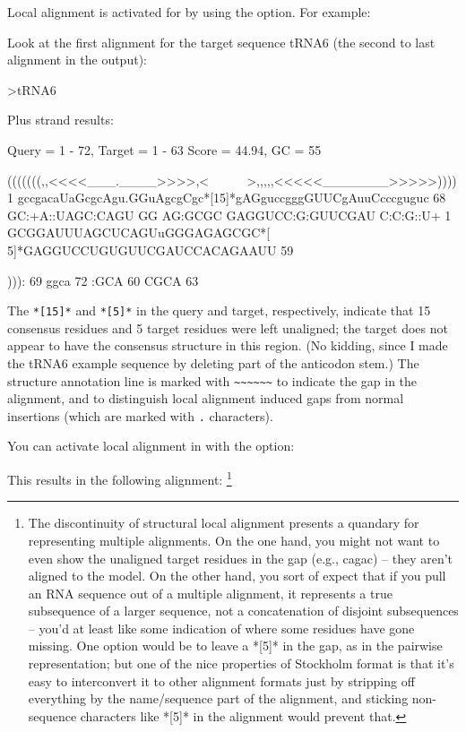 Local alignment is activated for  by using the
 option. For example:


Look at the first alignment for the target sequence tRNA6 (the second
to last alignment in the output): 

\begin{sreoutput}
>tRNA6

  Plus strand results:

 Query = 1 - 72, Target = 1 - 63
 Score = 44.94, GC =  55

           (((((((,,<<<<___.____>>>>,<~~~~~~>,,,,,<<<<<_______>>>>>))))
         1 gccgacaUaGcgcAgu.GGuAgcgCgc*[15]*gAGguccgggGUUCgAuuCcccguguc 68      
           GC:+A::UAGC:CAGU GG AG:GCGC      GAGGUCC:G:GUUCGAU C:C:G::U+
         1 GCGGAUUUAGCUCAGUuGGGAGAGCGC*[ 5]*GAGGUCCUGUGUUCGAUCCACAGAAUU 59      

           ))):
        69 ggca 72      
           :GCA
        60 CGCA 63      
\end{sreoutput}

The \verb+*[15]*+ and \verb+*[5]*+ in the query and target,
respectively, indicate that 15 consensus residues and 5 target
residues were left unaligned; the target does not appear to have the
consensus structure in this region. (No kidding, since I made the
tRNA6 example sequence by deleting part of the anticodon stem.)  The
structure annotation line is marked with \verb+~~~~~~+ to indicate the
gap in the alignment, and to distinguish local alignment induced gaps
from normal insertions (which are marked with \verb+.+ characters).

You can activate local alignment in  with the 
option:


This results in the following alignment:
\footnote{The discontinuity of structural local alignment presents a
quandary for representing multiple alignments. On the one hand, you
might not want to even show the unaligned target residues in the gap
(e.g., cagac) -- they aren't aligned to the model. On the other hand,
you sort of expect that if you pull an RNA sequence out of a multiple
alignment, it represents a true subsequence of a larger sequence, not
a concatenation of disjoint subsequences -- you'd at least like some
indication of where some residues have gone missing. One option would
be to leave a *[5]* in the gap, as in the pairwise
representation; but one of the nice properties of Stockholm format is
that it's easy to interconvert it to other alignment formats just by
stripping off everything by the name/sequence part of the alignment,
and sticking non-sequence characters like *[5]* in the
alignment would prevent that.}

